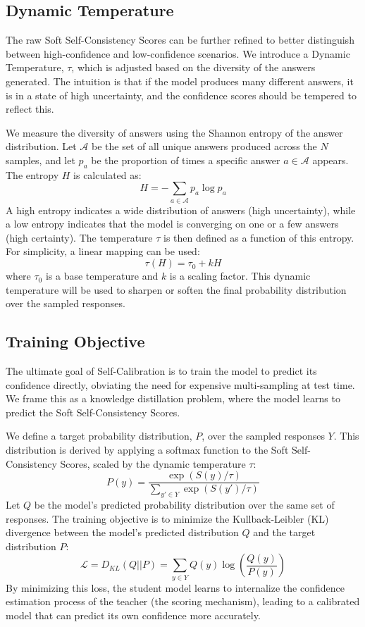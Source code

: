 \documentclass{article}
\begin{document}
\subsection{Dynamic Temperature}
The raw Soft Self-Consistency Scores can be further refined to better distinguish between high-confidence and low-confidence scenarios. We introduce a Dynamic Temperature, $\tau$, which is adjusted based on the diversity of the answers generated. The intuition is that if the model produces many different answers, it is in a state of high uncertainty, and the confidence scores should be tempered to reflect this.

We measure the diversity of answers using the Shannon entropy of the answer distribution. Let $\mathcal{A}$ be the set of all unique answers produced across the $N$ samples, and let $p_a$ be the proportion of times a specific answer $a \in \mathcal{A}$ appears. The entropy $H$ is calculated as:
\begin{equation}
H = - \sum_{a \in \mathcal{A}} p_a \log p_a
\end{equation}
A high entropy indicates a wide distribution of answers (high uncertainty), while a low entropy indicates that the model is converging on one or a few answers (high certainty). The temperature $\tau$ is then defined as a function of this entropy. For simplicity, a linear mapping can be used:
\begin{equation}
\tau(H) = \tau_0 + kH
\end{equation}
where $\tau_0$ is a base temperature and $k$ is a scaling factor. This dynamic temperature will be used to sharpen or soften the final probability distribution over the sampled responses.

\subsection{Training Objective}
The ultimate goal of Self-Calibration is to train the model to predict its confidence directly, obviating the need for expensive multi-sampling at test time. We frame this as a knowledge distillation problem, where the model learns to predict the Soft Self-Consistency Scores.

We define a target probability distribution, $P$, over the sampled responses $Y$. This distribution is derived by applying a softmax function to the Soft Self-Consistency Scores, scaled by the dynamic temperature $\tau$:
\begin{equation}
P(y) = \frac{\exp(S(y)/\tau)}{\sum_{y' \in Y} \exp(S(y')/\tau)}
\end{equation}
Let $Q$ be the model's predicted probability distribution over the same set of responses. The training objective is to minimize the Kullback-Leibler (KL) divergence between the model's predicted distribution $Q$ and the target distribution $P$:
\begin{equation}
\mathcal{L} = D_{KL}(Q || P) = \sum_{y \in Y} Q(y) \log\left(\frac{Q(y)}{P(y)}\right)
\end{equation}
By minimizing this loss, the student model learns to internalize the confidence estimation process of the teacher (the scoring mechanism), leading to a calibrated model that can predict its own confidence more accurately.
\end{document}
